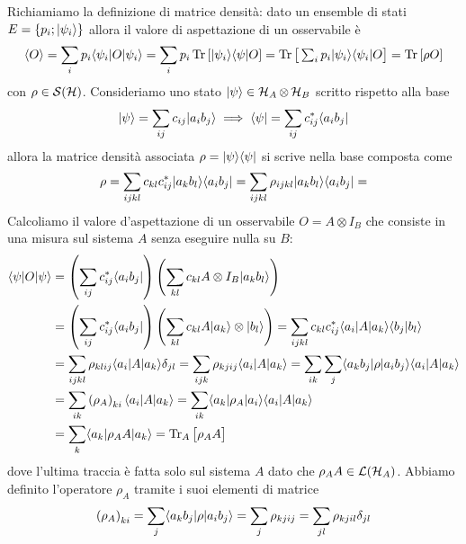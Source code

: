 Richiamiamo la definizione di matrice densità: dato un ensemble di stati $ E = \{p_i; \vert \psi_i \rangle\} $ allora il valore di aspettazione di un osservabile è 
\begin{align*}
  \sc{O} = \sum_i p_i \bk{\psi_i | O | \psi_i} = \sum_i p_i \Tr \left[ \k{\psi_i} \b{\psi} O \right] 
  = \Tr \left[ \phb \textstyle \sum_i p_i \k{\psi_i} \b{\psi_i} O\right] = \Tr \left[ \rho O \right]
\end{align*}
con $ \rho \in \mathcal{S}(\operatorname{\mathcal{H}}) $. Consideriamo uno stato $ \vert \psi \rangle \in \operatorname{\mathcal{H}}_A \otimes \operatorname{\mathcal{H}}_B $ scritto rispetto alla base 
\begin{align*}
  \vert \psi \rangle = \sum_{ij} c_{ij} \vert a_i b_j \rangle \implies \langle \psi \vert = \sum_{ij} c_{ij}^* \langle a_i b_j \vert
\end{align*}
allora la matrice densità associata $ \rho = \vert \psi \rangle \langle \psi \vert $ si scrive nella base composta come 
\begin{align*}
  \rho = \sum_{ijkl} c_{kl} c_{ij}^* \vert a_k b_l \rangle \langle a_i b_j \vert = \sum_{ijkl} \rho_{ijkl} \vert a_k b_l \rangle \langle a_i b_j \vert = 
\end{align*}
Calcoliamo il valore d'aspettazione di un osservabile $ O = A \otimes I_B $ che consiste in una misura sul sistema $ A $ senza eseguire nulla su $ B $:
\begin{align*}
  \bk{\psi | O | \psi} &= \left( \sum_{ij} c_{ij}^* \b{a_i b_j} \right) \left( \sum_{kl}c_{kl} A \otimes I_B \k{a_k b_l} \right) 
  \\
  &= \left( \sum_{ij} c_{ij}^* \b{a_i b_j} \right) \left( \sum_{k l} c_{kl} A \k{a_k} \otimes \k{b_l} \right) 
  = \sum_{ijkl} c_{kl} c_{ij}^*\bk{a_i | A | a_k} \bk{b_j | b_l} 
  \\
  &= \sum_{ijkl} \rho_{klij} \bk{a_i | A | a_k} \delta_{jl} = \sum_{ijk}  \rho_{kjij} \bk{a_i | A | a_k} 
  = \sum_{ik} \sum_j \bk{a_k b_j | \rho | a_i b_j} \bk{a_i | A | a_k}
  \\
  &= \sum_{ik} \left( \rho_A \right)_{ki} \bk{a_i | A | a_k} = \sum_{ik} \bk{a_k | \rho_A | a_i} \bk{a_i | A | a_k} 
  \\
  &= \sum_k \bk{a_k | \rho_A A | a_k} = \Tr_A\left[ \phb \rho_A A \right]
\end{align*}
dove l'ultima traccia è fatta solo sul sistema $ A $ dato che $ \rho_A A \in \operatorname{\mathcal{L}}(\operatorname{\mathcal{H}}_A) $. Abbiamo definito l'operatore $ \rho_A $ tramite 
i suoi elementi di matrice 
\begin{align*}
  \left( \rho_A \right)_{ki} = \sum_{j} \langle a_k b_j | \rho | a_i b_j \rangle = \sum_{j} \rho_{kjij} = \sum_{jl} \rho_{kjil} \delta_{jl}
\end{align*}
